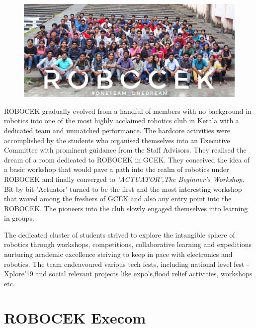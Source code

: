 \begin{figure}
    \centering
    \includegraphics{Images/ROBOCEK/robocek.jpeg}
\end{figure}

\par ROBOCEK gradually evolved from a handful of members with no background in robotics into one of the most highly acclaimed robotics club in Kerala with a dedicated team and unmatched performance. The hardcore activities were accomplished by the students who organised themselves into an Executive Committee with prominent guidance from the Staff Advisors. They realised the dream of a room dedicated to ROBOCEK in GCEK. They conceived the idea of a basic workshop that would pave a path into the realm of robotics under ROBOCEK and finally converged to \textit{'ACTUATOR',The Beginner's Workshop}. Bit by bit 'Actuator' turned to be the first and the most interesting workshop that waved among the freshers of GCEK and also any entry point into the ROBOCEK. The pioneers into the club slowly engaged themselves into learning in groups.

The dedicated cluster of students strived to explore the intangible sphere of robotics through workshops, competitions, collaborative learning and expeditions nurturing academic excellence striving to keep in pace with electronics and robotics. The team endeavoured various tech fests, including national level fest - Xplore'19 and social relevant projects like expo's,flood relief activities, workshops etc.

\section{ROBOCEK Execom}
    \begin{figure}
        \centering
        \quad
    \end{figure}
    
